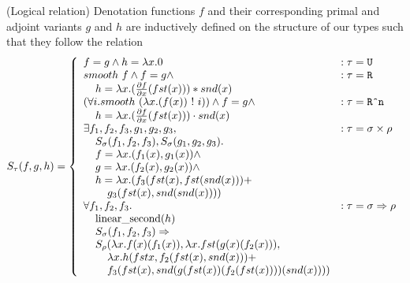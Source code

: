   \begin{definition}(Logical relation)
    Denotation functions $f$ and their corresponding primal and adjoint variants $g$ and $h$ are inductively defined on the structure of our types such that they follow the relation
    \begin{equation*}
      S_\tau(f, g, h) =
        \left\{
          \begin{array}{ll}
            f = g \wedge h = \lambda x. 0 & : \tau = \texttt{U} \\
            smooth\ f \wedge f = g \wedge
              & : \tau = \texttt{R} \\
              \;\;\;\; h = \lambda x.
                (\frac{\partial f}{\partial x}(fst(x))) * snd(x) \\
            (\forall i. smooth\ (\lambda x. (f(x))\ !\ i))
              \wedge f = g \wedge
              & : \tau = \texttt{R\^{}n} \\
              \;\;\;\; h = \lambda x.
                (\frac{\partial f}{\partial x}(fst(x))) \cdot snd(x) \\
            \exists f_1, f_2, f_3, g_1, g_2, g_3,
              & : \tau = \sigma \times \rho \\
              \;\;\;\;S_\sigma(f_1, f_2, f_3), S_\sigma(g_1, g_2, g_3). \\
              \;\;\;\;f = \lambda x. (f_1(x), g_1(x)) \wedge \\
              \;\;\;\;g = \lambda x. (f_2(x), g_2(x)) \wedge \\
              \;\;\;\;h = \lambda x. (f_3(fst(x), fst (snd(x))) + \\
              \;\;\;\;\;\;\;\;g_3(fst(x), snd (snd(x)))) \\
            \forall f_1, f_2, f_3.
              & : \tau = \sigma \Rightarrow \rho \\
              \;\;\;\;\text{linear\_second}(h) \\
              \;\;\;\;S_\sigma(f_1, f_2, f_3) \Rightarrow \\
              \;\;\;\;S_\rho(\lambda x. f(x)(f_1(x)), \lambda x. fst(g(x)(f_2(x))), \\
              \;\;\;\;\;\;\;\; \lambda x. h (fst x, f_2 (fst(x), snd(x))) + \\
              \;\;\;\;\;\;\;\; f_3 (fst(x), snd(g(fst(x))(f_2(fst(x))))(snd(x))))
          \end{array}
        \right.
    \label{eqn:lr_combinator}
    \end{equation*}
  \end{definition}

